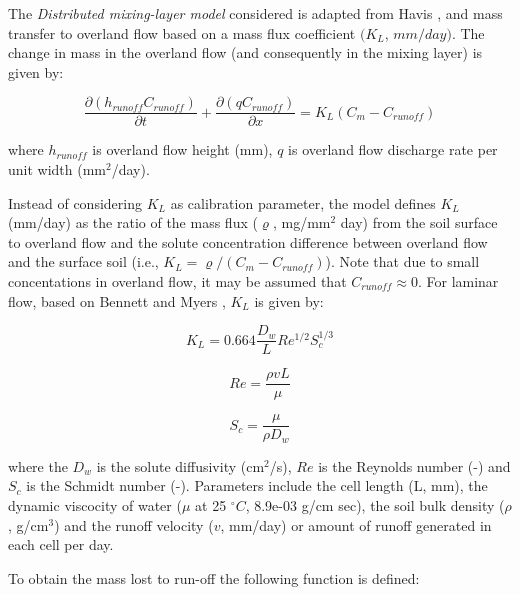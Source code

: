 \documentclass[]{article}
\begin{document}
The \textit{Distributed mixing-layer model} considered is adapted from
Havis \citeyearpar{Havis1992}, and mass transfer to overland flow based
on a mass flux coefficient \((K_L\), \(mm/day)\). The change in mass in
the overland flow (and consequently in the mixing layer) is given by:

\begin{equation}
\frac{\partial (h_{runoff} C_{runoff}) }{\partial t} + \frac{\partial(qC_{runoff}) }{\partial x} = K_L (C_m - C_{runoff})
\label{eq:d-mlm-of}
\end{equation}

where \(h_{runoff}\) is overland flow height (mm), \(q\) is overland
flow discharge rate per unit width (mm\(^2\)/day).

Instead of considering \(K_L\) as calibration parameter, the model
defines \(K_L\) (mm/day) as the ratio of the mass flux (\(\varrho\),
mg/mm\(^2\) day) from the soil surface to overland flow and the solute
concentration difference between overland flow and the surface soil
(i.e., \(K_L = \varrho /(C_m - C_{runoff})\)). Note that due to small
concentations in overland flow, it may be assumed that
\(C_{runoff} \approx 0\). For laminar flow, based on Bennett and Myers
\citeyearpar{Bennet1982}, \(K_L\) is given by:

\begin{equation}
K_L = 0.664 \frac{D_w}{L}Re^{1/2}S_c^{1/3}
\label{eq:K_L}
\end{equation}

\begin{equation}
Re = \frac{\rho v L}{\mu}
\label{eq:Re}
\end{equation}

\begin{equation}
S_c = \frac{ \mu}{\rho D_w}
\label{eq:S_c}
\end{equation}

where the \(D_w\) is the solute diffusivity (cm\(^2\)/s), \(Re\) is the
Reynolds number (-) and \(S_c\) is the Schmidt number (-). Parameters
include the cell length (L, mm), the dynamic viscocity of water (\(\mu\)
at 25 \(^\circ C\), 8.9e-03 g/cm sec), the soil bulk density (\(\rho\),
g/cm\(^3\)) and the runoff velocity (\(v\), mm/day) or amount of runoff
generated in each cell per day.

To obtain the mass lost to run-off the following function is defined:
\end{document}

